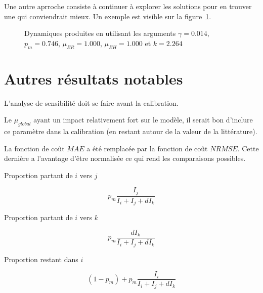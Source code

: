 \documentclass[a4paper, 11pt]{article}
\begin{document}
Une autre aprroche consiste à continuer à explorer les solutions pour en trouver une qui conviendrait mieux. Un exemple est visible sur la figure~\ref{arg5}.

\begin{figure}[ht]
 \centering
 \caption{Dynamiques produites en utilisant les arguments $\gamma = 0.014$, $p_m = 0.746$, $\mu_{ER} = 1.000$, $\mu_{EH} = 1.000$ et $k = 2.264$}
 \label{arg5}
\end{figure}


\section{Autres résultats notables}

L'analyse de sensibilité doit se faire avant la calibration. 

Le $\mu_{global}$ ayant un impact relativement fort sur le modèle, il serait bon d'inclure ce paramètre dans la calibration (en restant autour de la valeur de la littérature).

La fonction de coût $MAE$ a été remplacée par la fonction de coût $NRMSE$. Cette dernière a l'avantage d'être normalisée ce qui rend les comparaisons possibles.



\newpage
\clearpage

Proportion partant de $i$ vers $j$

$$
p_m \frac{I_j}{I_i + I_j + dI_k}
$$


Proportion partant de $i$ vers $k$

$$
p_m \frac{dI_k}{I_i + I_j + dI_k}
$$

Proportion restant dans $i$

$$
(1 - p_m) + p_m \frac{I_i}{I_i + I_j + dI_k}
$$
\end{document}
